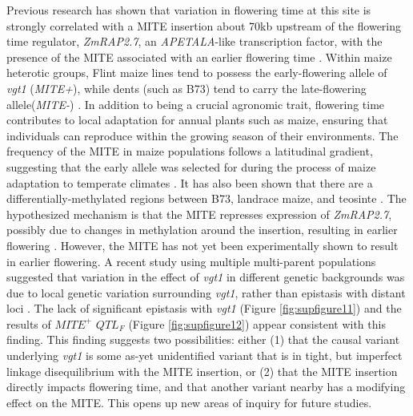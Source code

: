 \documentclass[article,9pt,twocolumn,twoside]{rilabRxiv}
\begin{document}
Previous research  has shown that variation in flowering time at this site is strongly correlated with a MITE insertion about 70kb upstream of the flowering time regulator, \emph{ZmRAP2.7}, an \emph{APETALA}-like transcription factor, with the presence of the MITE associated with an earlier flowering time \cite{Castelletti}.
Within maize heterotic groups, Flint maize lines tend to possess the early-flowering allele of \emph{vgt1} (\emph{MITE+}), while dents (such as B73) tend to carry the late-flowering allele(\emph{MITE-}) \citep{Salvi}.
In addition to being a crucial agronomic trait, flowering time contributes to local adaptation for annual plants such as maize, ensuring that individuals can reproduce within the growing season of their environments.
The frequency of the MITE in maize populations follows a latitudinal gradient, suggesting that the early allele was selected for during the process of maize adaptation to temperate climates \cite{Navarro}.
It has also been shown that there are a differentially-methylated regions between B73, landrace maize, and teosinte \cite{Xu}.
The hypothesized mechanism is that the MITE represses expression of \emph{ZmRAP2.7}, possibly due to changes in methylation around the insertion, resulting in earlier flowering \cite{Castelletti}.
However, the MITE has not yet been experimentally shown to result in earlier flowering.
A recent study using multiple multi-parent populations suggested that variation in the effect of \emph{vgt1} in different genetic backgrounds was due to local genetic variation surrounding \emph{vgt1}, rather than epistasis with distant loci \citep{Rio}.
The lack of significant epistasis with \emph{vgt1} (Figure \ref{fig:supfigure11}) and the results of $MITE^+$ $QTL_F$ (Figure \ref{fig:supfigure12}) appear consistent with this finding.
This finding suggests two possibilities: either (1) that the causal variant underlying \emph{vgt1} is some as-yet unidentified variant that is in tight, but imperfect linkage disequilibrium with the MITE insertion, or (2) that the MITE insertion directly impacts flowering time, and that another variant nearby has a modifying effect on the MITE.
This opens up new areas of inquiry for future studies.
\end{document}

